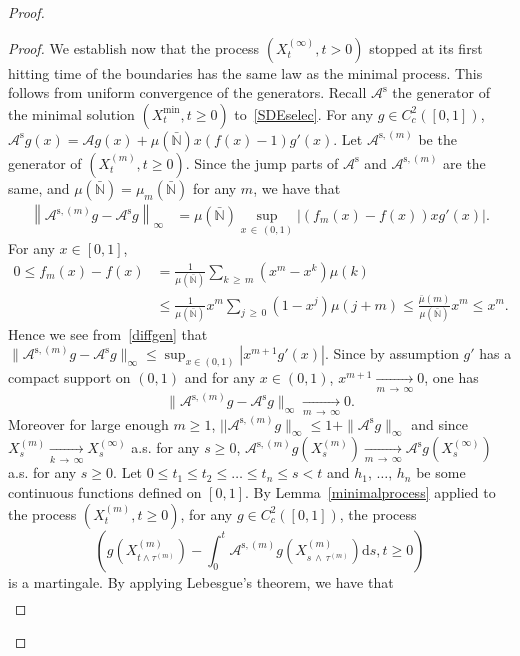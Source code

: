 \documentclass[10pt]{amsart}
\theoremstyle{definition}\newtheorem{defi}[theo]{Definition}\newtheorem{rema}[theo]{Remark}\newtheorem{exam}[theo]{Example}\newtheorem{exem}[theo]{Example}\newtheorem{nota}[theo]{Notation}
\newcommand{\ddr}{\mathrm{d}}
\newcommand{\rms}{\mathrm{s}}
\newcommand{\bbN}{\mathbb{N}}
\newcommand{\clA}{\mathcal{A}}
\begin{document}
\begin{proof}
\begin{proof}
We establish now that the process $(X^{(\infty)}_t,t>0)$ stopped at its first hitting time of the boundaries has the same law as the minimal process. This follows from uniform convergence of the generators. Recall $\clA^{\rms}$ the generator of the minimal solution $(X^{\min}_t,t\geq 0)$ to~\eqref{SDEselec}. For any $g\in C^2_c([0,1])$, $\clA^{\rms}g(x)=\clA g(x)+\mu(\bar{\bbN})x(f(x)-1)g'(x)$. Let $\clA^{\rms,(m)}$ be the generator of $(X_t^{(m)},t\geq 0)$. Since the jump parts of $\clA^{\rms}$ and $\clA^{\rms,(m)}$ are the same, and $\mu(\bar{\bbN})=\mu_m(\bar{\bbN})$ for any $m$, we have that
\begin{align}\label{diffgen}
\left\|\clA^{\rms,(m)}g-\clA^{\rms}g\right\|_{\infty}&=\mu(\bar{\bbN})\underset{x\,\in\, (0,1)}{\sup}\left|(f_m(x)-f(x))xg'(x)\right|.
\end{align}
For any $x\in [0,1]$,
\begin{align*}
0\leq f_m(x)-f(x)&=\frac{1}{\mu(\bar{\bbN})}\sum_{k\,\geq\,m}\left(x^{m}-x^{k}\right)\mu(k)\\
&\leq \frac{1}{\mu(\bar{\bbN})}x^{m}\sum_{j\,\geq\,0}(1-x^{j})\mu(j+m)\leq \frac{\bar{\mu}(m)}{\mu(\bar{\bbN})}x^m\leq x^m.
\end{align*}
Hence we see from~\eqref{diffgen} that $\|\clA^{\rms,(m)}g-\clA^{\rms}g\|_{\infty}\leq \sup_{x\in (0,1)}|x^{m+1}g'(x)|$. Since by assumption $g'$ has a compact support on $(0,1)$ and for any $x\in (0,1)$, $x^{m+1}\underset{m\,\rightarrow\,\infty}{\longrightarrow}0$, one has
\begin{equation}\label{convunifAm}
\|\clA^{\rms,(m)}g-\clA^{\rms}g\|_{\infty}\underset{m\,\rightarrow\,\infty}{\longrightarrow} 0.
\end{equation}
Moreover for large enough $m\geq 1$, $||\clA^{\rms,(m)}g\|_\infty\leq 1+\|\clA^{\rms}g\|_\infty$ and since $X_s^{(m)}\underset{k\,\rightarrow\,\infty}{\longrightarrow} X_s^{(\infty)}$ a.s. for any $s\geq 0$, $\clA^{\rms,(m)}g(X_s^{(m)})\underset{m\,\rightarrow\,\infty}{\longrightarrow} \clA^{\rms}g(X_s^{(\infty)})$ a.s. for any $s\geq 0$. Let $0\leq t_1\leq t_2\leq \ldots \leq t_n\leq s<t$ and $h_1,\,\ldots,\,h_n$ be some continuous functions defined on $[0,1]$. By Lemma~\ref{minimalprocess} applied to the process $(X_t^{(m)},t\geq 0)$, for any $g\in C_c^{2}([0,1])$, the process
\[
\left(g\left(X_{t\wedge \tau^{(m)}}^{(m)} \right)-\int_{0}^{t}\clA^{\rms,(m)}g\left(X_{s\,\wedge\,\tau^{(m)}}^{(m)}\right)\ddr s, t\geq 0\right)
\]
is a martingale. By applying Lebesgue's theorem, we have that
\begin{multline*}

\end{multline*}
\end{proof}
\end{proof}
\end{document}
